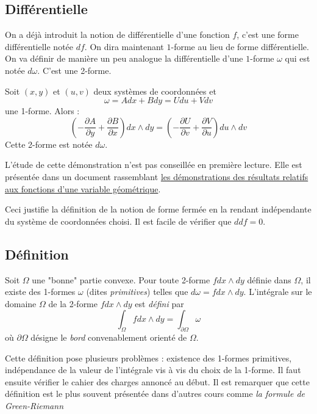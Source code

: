 \subsection{Différentielle}
On a déjà introduit la notion de différentielle d'une fonction $f$, c'est une forme différentielle notée $df$. On dira maintenant $1$-forme au lieu de forme différentielle. On va définir de manière un peu analogue la différentielle d'une $1$-forme $\omega$ qui est notée $d\omega$. C'est une 2-forme. 
\begin{prop}
 Soit $(x,y)$ et $(u,v)$ deux systèmes de coordonnées et 
\begin{displaymath}
 \omega = A dx + B dy = U du + Vdv
\end{displaymath}
une 1-forme. Alors :
\begin{displaymath}
 \left( -\frac{\partial A}{\partial y}+\frac{\partial B}{\partial x}\right)dx\wedge dy =
 \left( -\frac{\partial U}{\partial v}+\frac{\partial V}{\partial u}\right)du\wedge dv 
\end{displaymath}
Cette 2-forme est notée $d\omega$.
\end{prop}
\begin{demo}
 L'étude de cette démonstration n'est pas conseillée en première lecture. Elle est présentée dans un document rassemblant \href{\baseurl C6308.pdf}{les démonstrations des résultats relatifs aux fonctions d'une variable géométrique}.
\end{demo}
\begin{rem}
 Ceci justifie la définition de la notion de forme fermée en la rendant indépendante du système de coordonnées choisi. Il est facile de vérifier que $ddf=0$.
\end{rem}

\subsection{Définition}
\begin{propdef}
 Soit $\Omega$ une "bonne" partie convexe. Pour toute 2-forme $fdx\wedge dy$ définie dans $\Omega$, il existe des 1-formes $\omega$ (dites \emph{primitives}) telles que $d\omega = f dx\wedge dy$. L'intégrale sur le domaine $\Omega$ de la 2-forme $fdx\wedge dy$ est \emph{défini} par
\begin{displaymath}
 \int_\Omega f dx\wedge dy = \int_{\partial \Omega}\omega
\end{displaymath}
où $\partial \Omega$ désigne le \emph{bord} convenablement orienté de $\Omega$.
\end{propdef}
Cette définition pose plusieurs problèmes : existence des 1-formes \og primitives\fg, indépendance de la valeur de l'intégrale vis à vis du choix de la 1-forme. Il faut ensuite vérifier le cahier des charges annoncé au début.\newline
{}Il est remarquer que cette définition est le plus souvent présentée dans d'autres cours comme \emph{la formule de Green-Riemann}
